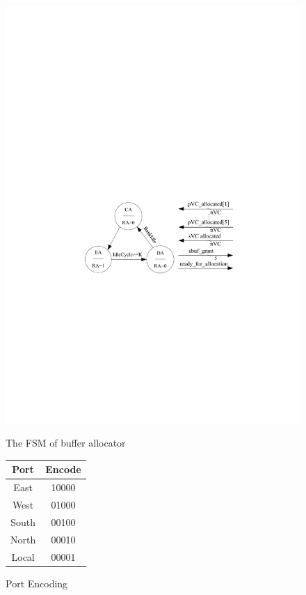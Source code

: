 \documentclass[10pt,conference]{IEEEtran}
\begin{document}
\begin{figure}[htb]
  \begin{minipage}[b]{0.3\textwidth}
    \centering\includegraphics[scale=0.6]{figures/allocFSM.pdf}
    \caption{The FSM of buffer allocator}\label{allocFSM}
  \end{minipage}%
  \begin{minipage}[b]{0.2\textwidth}
    \centering
    \begin{tabular}{|c|c|}
      \hline
      Port & Encode \\
      \hline\hline
      East  & 10000 \\
      \hline
      West    & 01000 \\
      \hline
      South &   00100\\
      \hline
      North & 00010\\
      \hline
      Local & 00001\\
      \hline
    \end{tabular}
    \caption{Port Encoding}\label{portencode}
  \end{minipage}
\end{figure}
\end{document}
